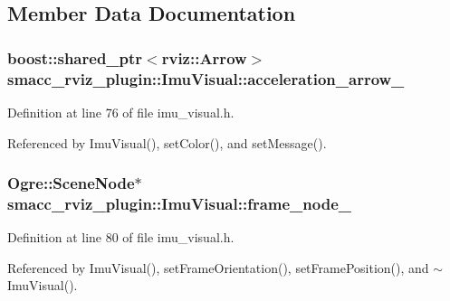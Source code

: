 \subsection{Member Data Documentation}
\subsubsection[{\texorpdfstring{acceleration\+\_\+arrow\+\_\+}{acceleration_arrow_}}]{\setlength{\rightskip}{0pt plus 5cm}boost\+::shared\+\_\+ptr$<$rviz\+::\+Arrow$>$ smacc\+\_\+rviz\+\_\+plugin\+::\+Imu\+Visual\+::acceleration\+\_\+arrow\+\_\+\hspace{0.3cm}{\ttfamily [private]}}\hypertarget{classsmacc__rviz__plugin_1_1ImuVisual_abead7d3f3c66b20bba8123a145b121b0}{}\label{classsmacc__rviz__plugin_1_1ImuVisual_abead7d3f3c66b20bba8123a145b121b0}


Definition at line 76 of file imu\+\_\+visual.\+h.



Referenced by Imu\+Visual(), set\+Color(), and set\+Message().

\subsubsection[{\texorpdfstring{frame\+\_\+node\+\_\+}{frame_node_}}]{\setlength{\rightskip}{0pt plus 5cm}Ogre\+::\+Scene\+Node$\ast$ smacc\+\_\+rviz\+\_\+plugin\+::\+Imu\+Visual\+::frame\+\_\+node\+\_\+\hspace{0.3cm}{\ttfamily [private]}}\hypertarget{classsmacc__rviz__plugin_1_1ImuVisual_ae41316c00ac89e1e0ee0adf62da10841}{}\label{classsmacc__rviz__plugin_1_1ImuVisual_ae41316c00ac89e1e0ee0adf62da10841}


Definition at line 80 of file imu\+\_\+visual.\+h.



Referenced by Imu\+Visual(), set\+Frame\+Orientation(), set\+Frame\+Position(), and $\sim$\+Imu\+Visual().

